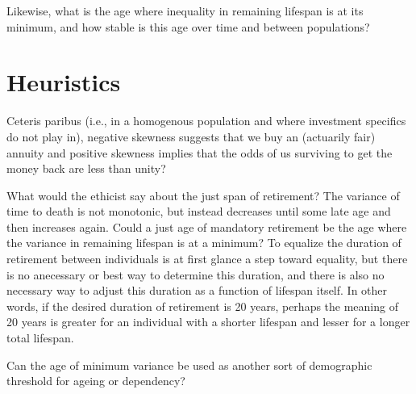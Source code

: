 \documentclass{article}
\begin{document}
Likewise, what is the age where inequality in remaining lifespan is at its
minimum, and how stable is this age over time and between populations?

\section{Heuristics}
Ceteris paribus (i.e., in a homogenous population and where investment
specifics do not play in), negative skewness suggests that we buy an (actuarily
fair) annuity and positive skewness implies that the odds of us surviving to get 
the money back are less than unity?

What would the ethicist say about the just span of retirement? The variance of
time to death is not monotonic, but instead decreases until some late age and
then increases again. Could a just age of mandatory retirement be the age where
the variance in remaining lifespan is at a minimum? To equalize the duration of
retirement between individuals is at first glance a step toward equality, but
there is no anecessary or best way to determine this duration, and there is also
no necessary way to adjust this duration as a function of lifespan itself. In
other words, if the desired duration of retirement is 20 years, perhaps the
meaning of 20 years is greater for an individual with a shorter lifespan and
lesser for a longer total lifespan.

Can the age of minimum variance be used as another sort of demographic threshold
for ageing or dependency?


\end{document}
